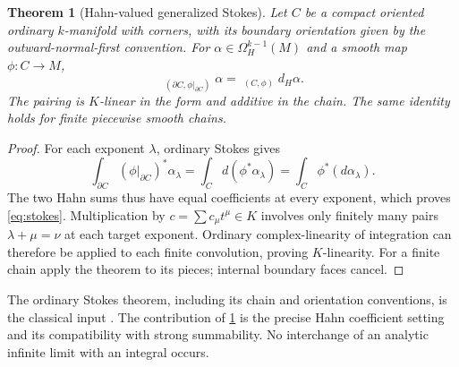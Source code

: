 \documentclass[11pt,letterpaper]{article}
\newtheorem{theorem}{Theorem}[section]
\theoremstyle{definition}
\theoremstyle{remark}
\newcommand{\HInt}{\mathop{\int^{\!H}}\nolimits}
\numberwithin{equation}{section}
\begin{document}
\begin{theorem}[Hahn-valued generalized Stokes]\label{thm:stokes}
Let $C$ be a compact oriented ordinary $k$-manifold with corners, with its boundary orientation given by the outward-normal-first convention. For $\alpha\in\Omega_H^{k-1}(M)$ and a smooth map $\phi:C\to M$,
\begin{equation}\label{eq:stokes}
 \boxed{\qquad
 \HInt_{(\partial C,\phi|_{\partial C})}\alpha
 =\HInt_{(C,\phi)}d_H\alpha.
 \qquad}
\end{equation}
The pairing is $K$-linear in the form and additive in the chain. The same identity holds for finite piecewise smooth chains.
\end{theorem}
\begin{proof}
For each exponent $\lambda$, ordinary Stokes gives
\[
 \int_{\partial C}(\phi|_{\partial C})^*\alpha_\lambda
 =\int_C d(\phi^*\alpha_\lambda)
 =\int_C\phi^*(d\alpha_\lambda).
\]
The two Hahn sums thus have equal coefficients at every exponent, which proves \eqref{eq:stokes}. Multiplication by $c=\sum c_\mu t^\mu\in K$ involves only finitely many pairs $\lambda+\mu=\nu$ at each target exponent. Ordinary complex-linearity of integration can therefore be applied to each finite convolution, proving $K$-linearity. For a finite chain apply the theorem to its pieces; internal boundary faces cancel.
\end{proof}

The ordinary Stokes theorem, including its chain and orientation conventions, is the classical input \cite{Lee}. The contribution of \cref{thm:stokes} is the precise Hahn coefficient setting and its compatibility with strong summability. No interchange of an analytic infinite limit with an integral occurs.
\end{document}
